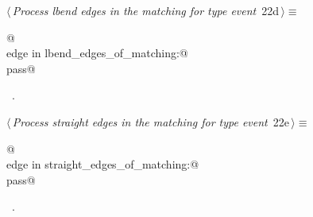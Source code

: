 \documentclass[10pt, english, oneside]{report}
\begin{document}
\begin{flushleft} \small
\begin{minipage}{\linewidth}\label{scrap27}\raggedright\small
{} $\langle\,${\itshape Process lbend edges in the matching for type  event}\nobreak\ {\footnotesize {22d}}$\,\rangle\equiv$
\vspace{-1ex}
\begin{list}{}{} \item
\mbox{}\verb@   @\\
\mbox{}\verb@for edge in lbend_edges_of_matching:@\\
\mbox{}\verb@        pass@\\
\mbox{}\verb@@{\NWsep}
\end{list}
\vspace{-1.5ex}
\footnotesize
\begin{list}{}{\setlength{\itemsep}{-\parsep}\setlength{\itemindent}{-\leftmargin}}
\item \NWtxtMacroRefIn\ .

\item{}
\end{list}
\end{minipage}\vspace{4ex}
\end{flushleft}


\begin{flushleft} \small
\begin{minipage}{\linewidth}\label{scrap28}\raggedright\small
{} $\langle\,${\itshape Process straight edges in the matching for type  event}\nobreak\ {\footnotesize {22e}}$\,\rangle\equiv$
\vspace{-1ex}
\begin{list}{}{} \item
\mbox{}\verb@   @\\
\mbox{}\verb@for edge in straight_edges_of_matching:@\\
\mbox{}\verb@      pass@\\
\mbox{}\verb@@{\NWsep}
\end{list}
\vspace{-1.5ex}
\footnotesize
\begin{list}{}{\setlength{\itemsep}{-\parsep}\setlength{\itemindent}{-\leftmargin}}
\item \NWtxtMacroRefIn\ .

\item{}
\end{list}
\end{minipage}\vspace{4ex}
\end{flushleft}
\end{document}

